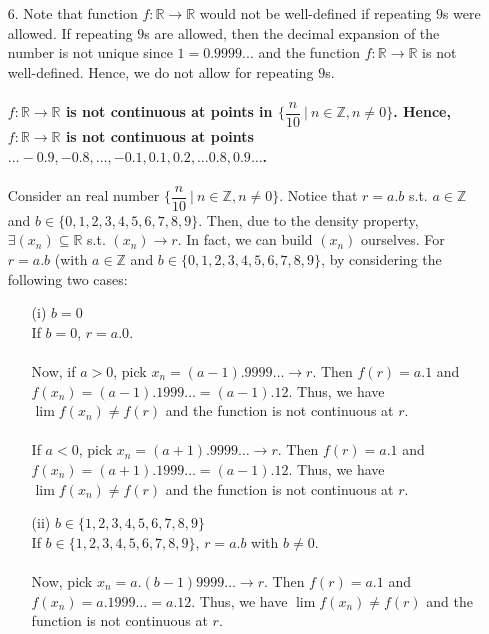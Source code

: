 \documentclass[11pt]{article}
\newcommand{\reals}{\mathbb{R}}
\newcommand{\ints}{\mathbb{Z}}
\begin{document}
\begin{itemize}
    \item[6.]
        Note that function $f : \reals \to \reals$ would not be well-defined if
        repeating $9$s were allowed. If repeating $9$s are allowed, then the
        decimal expansion of the number is not unique since $1 = 0.9999...$ and
        the function $f : \reals \to \reals$ is not well-defined. Hence, we do
        not allow for repeating $9$s.
        \\
        \\
        \textbf{$f : \reals \to \reals$ is not continuous at points in
        $\Big\{\dfrac{n}{10} \ \big| \ n \in \ints, n \neq 0 \Big\}$. Hence, $f
        : \reals \to \reals$ is not continuous at points $\dots -0.9, -0.8,
        \dots, -0.1, 0.1, 0.2, \dots 0.8, 0.9 \dots$.}
        \\
        \\
        Consider an real number $\Big\{\dfrac{n}{10} \ \big| \ n \in \ints, n
        \neq 0 \Big\}$. Notice that $r = a.b$ s.t. $a \in \ints$ and $b \in
        \{0, 1, 2, 3, 4, 5, 6, 7, 8, 9\}$. Then, due to the density property,
        $\exists (x_n) \subseteq \reals$ s.t. $(x_n) \to r$. In fact, we can
        build $(x_n)$ ourselves. For $r = a.b$ (with $a \in \ints$ and $b \in
        \{0, 1, 2, 3, 4, 5, 6, 7, 8, 9\}$, by considering the following two
        cases:
        \begin{itemize}
            \item[(i)]
                $b = 0$
                \\
                If $b = 0$, $r = a.0$.
                \\
                \\
                Now, if $a > 0$, pick $x_n = (a - 1).9999\dots \to r$. Then
                $f(r) = a.1$ and $f(x_n) = (a - 1).1999\dots = (a - 1).12$.
                Thus, we have $\lim{f(x_n)} \neq f(r)$ and the function is not
                continuous at $r$.
                \\
                \\
                If $a < 0$, pick $x_n = (a + 1).9999\dots \to r$. Then $f(r) =
                a.1$ and $f(x_n) = (a + 1).1999\dots = (a - 1).12$. Thus, we
                have $\lim{f(x_n)} \neq f(r)$ and the function is not
                continuous at $r$.

            \item[(ii)]
                $b \in \{1, 2, 3, 4, 5, 6, 7, 8, 9\}$
                \\
                If $b \in \{1, 2, 3, 4, 5, 6, 7, 8, 9\}$, $r = a.b$ with $b
                \neq 0$.
                \\
                \\
                Now, pick $x_n = a.(b - 1)9999\dots \to r$. Then $f(r) = a.1$
                and $f(x_n) = a.1999\dots = a.12$. Thus, we have $\lim{f(x_n)}
                \neq f(r)$ and the function is not continuous at $r$.
        \end{itemize}


\end{itemize}
\end{document}
